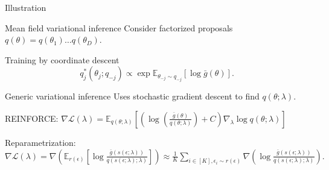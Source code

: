 \documentclass{beamer}
\def \Ev {{\mathbb E}}
\def \gu {{\bar{g}}}
\begin{document}
\begin{frame}{}
\begin{block}{Illustration}
\begin{figure}
\centering
\captionsetup[subfigure]{labelformat=empty}
\end{figure}
\end{block}
\end{frame}

\begin{frame}{}
\begin{block}{Mean field variational inference}
Consider factorized proposals $q(\theta) = q(\theta_1)\ldots q(\theta_D)$.

Training by coordinate descent 
\begin{equation*}
q^{*}_j(\theta_j;q_{-j}) \propto \exp \Ev_{\theta_{-j} \sim q_{-j}} [ \log \gu(\theta)].
\end{equation*}

\end{block}
\begin{block}{Generic variational inference}
Uses stochastic gradient descent to find $q(\theta;\lambda)$.

REINFORCE: $\nabla \mathcal{L}(\lambda) = \Ev_{q(\theta;\lambda)} \left[ \left( \log \left( \frac{\gu(\theta)}{q(\theta;\lambda)}\right) + C\right) \nabla_{\lambda} \log q(\theta;\lambda) \right]$

Reparametrization: $\nabla \mathcal{L}(\lambda) = \nabla \left( \Ev_{r(\epsilon)} \left[\log \frac{ \gu(s(\epsilon;\lambda))}{q(s(\epsilon;\lambda);\lambda)}\right]\right) \approx \frac{1}{K} \sum_{i \in [K], \epsilon_i \sim r(\epsilon)} \nabla \left( \log \frac{ \gu(s(\epsilon;\lambda))}{q(s(\epsilon;\lambda);\lambda)} \right).$
\end{block}
\end{frame}
\end{document}
